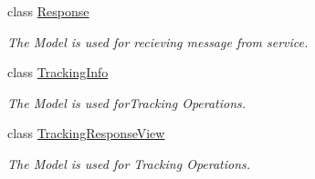 \begin{DoxyCompactItemize}
class \hyperlink{classWildlifeTrackingApp_1_1Models_1_1Response}{Response}
\begin{DoxyCompactList}\small\item\em The Model is used for recieving message from service. \end{DoxyCompactList}\item 
class \hyperlink{classWildlifeTrackingApp_1_1Models_1_1TrackingInfo}{Tracking\+Info}
\begin{DoxyCompactList}\small\item\em The Model is used for\+Tracking Operations. \end{DoxyCompactList}\item 
class \hyperlink{classWildlifeTrackingApp_1_1Models_1_1TrackingResponseView}{Tracking\+Response\+View}
\begin{DoxyCompactList}\small\item\em The Model is used for Tracking Operations. \end{DoxyCompactList}\end{DoxyCompactItemize}
